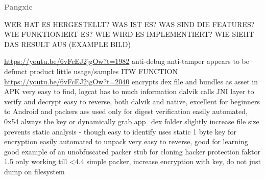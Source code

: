 \newline\newline\textbf{\textcolor{gray}{Pangxie}}\newline

WER HAT ES HERGESTELLT? WAS IST ES? WAS SIND DIE FEATURES? WIE FUNKTIONIERT ES? WIE WIRD ES IMPLEMENTIERT? WIE SIEHT DAS RESULT AUS (EXAMPLE BILD)\newline

\url{https://youtu.be/6vFcEJ2jgOw?t=1982}\newline
anti-debug\newline
anti-tamper\newline
appears to be defunct product\newline
little usage/samples ITW\newline
FUNCTION\newline
\url{https://youtu.be/6vFcEJ2jgOw?t=2040}\newline
encrypts dex file and bundles as asset in APK\newline
very easy to find, logcat has to much information\newline
dalvik calls JNI layer to verify and decrypt\newline
easy to reverse, both dalvik and native, excellent for beginners to Android and packers\newline
aes used only for digest verification\newline
easily automated, 0x54 always the key\newline
or dynamically grab app\_dex folder\newline
slightly increase file size\newline
prevents static analysis - though easy to identify\newline
uses static 1 byte key for encryption\newline
easily automated to unpack\newline
very easy to reverse, good for learning\newline
good example of an unobfuscated packer stub for cloning\newline
hacker protection faktor 1.5\newline
only working till <4.4\newline
simple packer, increase encryption with key, do not just dump on filesystem
